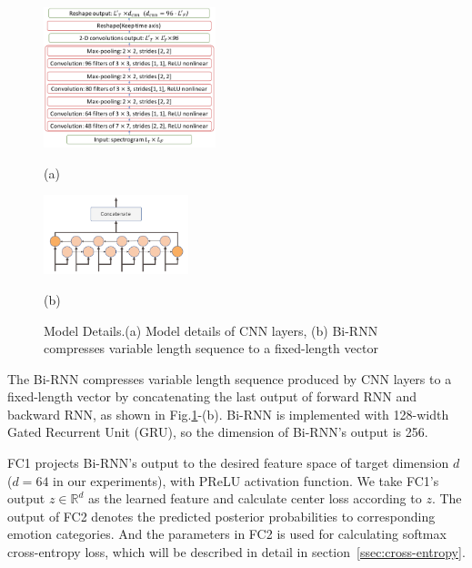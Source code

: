 \documentclass{article}
\begin{document}
\begin{figure}[htb]
	\begin{minipage}[b]{0.04\linewidth}
		\hfill
	\end{minipage}
	\begin{minipage}[b]{0.52\linewidth}
		\centering
		\centerline{\includegraphics[width=5.0cm]{fig2.pdf}}
		\centerline{\small(a)}\medskip
		
	\end{minipage}
	\hfill
	\begin{minipage}[b]{.42\linewidth}
		\centering
		\centerline{\includegraphics[width=4.2cm, angle=270]{fig3.pdf}}
		\centerline{\small(b)  }\medskip
	\end{minipage}
	\caption{Model Details.(a) Model details of CNN layers, (b) Bi-RNN compresses variable length sequence to a fixed-length vector}
	\label{fig:model_detail}
\end{figure}

The Bi-RNN compresses variable length sequence produced by CNN layers to a fixed-length vector by concatenating the last output of forward RNN and backward RNN, as shown in Fig.\ref{fig:model_detail}-(b). Bi-RNN is implemented with 128-width Gated Recurrent Unit ({GRU})\cite{Cho2014Learning}, so the dimension of Bi-RNN's output is 256.

FC1 projects Bi-RNN's output to the desired feature space of target dimension $d$ ($d=64$ in our experiments), with PReLU\cite{He2015Delving} activation function. We take FC1's output $z \in \mathbb{R}^d$ as the learned feature and calculate center loss according to $z$. The output of FC2 denotes the predicted posterior probabilities to corresponding emotion categories. And the parameters in FC2 is used for calculating softmax cross-entropy loss, which will be described in detail in section~\ref{ssec:cross-entropy}. 
\end{document}
